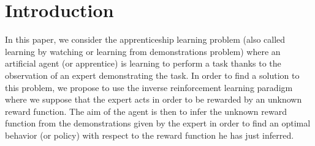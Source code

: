 \documentclass{article}
\begin{document}
\section{Introduction}
In this paper, we consider the apprenticeship learning problem (also called learning by watching or learning from demonstrations problem) where an artificial agent (or apprentice) is learning to perform a task thanks to the observation of an expert demonstrating the task. In order to find a solution to this problem, we propose to use the inverse reinforcement learning paradigm where we suppose that the expert acts in order to be rewarded by an unknown reward function. The aim of the agent is then to infer the unknown reward function from the demonstrations given by the expert in order to find an optimal behavior (or policy) with respect to the reward function he has just inferred.
\end{document}
